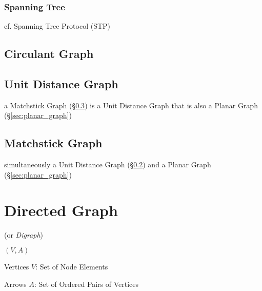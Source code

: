 \subsubsection{Spanning Tree}\label{sec:spanning_tree}

cf. Spanning Tree Protocol (STP)



\subsection{Circulant Graph}\label{sec:circulant_graph}

\subsection{Unit Distance Graph}\label{sec:unit_distance_graph}

a Matchstick Graph (\S\ref{sec:matchstick_graph}) is a Unit Distance Graph that
is also a Planar Graph (\S\ref{sec:planar_graph})



\subsection{Matchstick Graph}\label{sec:matchstick_graph}

simultaneously a Unit Distance Graph (\S\ref{sec:unit_distance_graph}) and a
Planar Graph (\S\ref{sec:planar_graph})



\section{Directed Graph}\label{sec:directed_graph}

(or \emph{Digraph})

$(V,A)$

Vertices $V$: Set of Node Elements

Arrows $A$: Set of Ordered Pairs of Vertices


